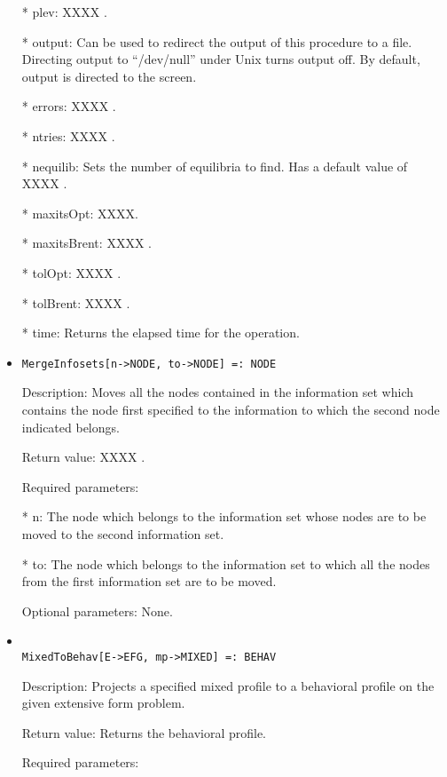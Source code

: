 \begin{itemize}
\bd
\item
[* plev:]XXXX .
\item
[* output:] Can be used to redirect the output of this procedure to a
file.  Directing output to ``/dev/null'' under Unix turns output off.
By default, output is directed to the screen.
\item
[* errors:] XXXX .
\item
[* ntries:] XXXX .
\item
[* nequilib:] Sets the number of equilibria to find.  Has a default 
value of XXXX . 
\item
[* maxitsOpt:] XXXX.
\item
[* maxitsBrent:] XXXX .
\item
[* tolOpt:] XXXX . 
\item
[* tolBrent:] XXXX .
\item
[* time:] Returns the elapsed time for the operation.
\ed
\ed

\item
\begin{verbatim}
MergeInfosets[n->NODE, to->NODE] =: NODE
\end{verbatim}

\bd
\item
[Description:] Moves all the nodes contained in the information set 
which contains the node first specified to the information to which the
second node indicated belongs.
\item
[Return value:] XXXX .
\item
[Required parameters:]\hfil\null

\bd
\item
[* n:] The node which belongs to the information set whose nodes are
to be moved to the second information set.
\item
[* to:] The node which belongs to the information set to which all
the nodes from the first information set are to be moved.
\ed

\item
[Optional parameters:] None.
\ed

\item
\begin{verbatim}

MixedToBehav[E->EFG, mp->MIXED] =: BEHAV
\end{verbatim}

\bd
\item
[Description:] Projects a specified mixed profile to a behavioral 
profile on the given extensive form problem.
\item
[Return value:] Returns the behavioral profile.
\item
[Required parameters:]\hfil\null


\end{itemize}
